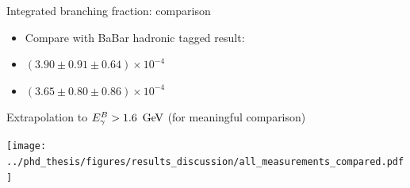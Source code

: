 \documentclass[xcolor=dvipsnames]{beamer}
\begin{document}
\begin{frame}{Integrated branching fraction: comparison}
\centering\scriptsize

\begin{itemize}
   \item Compare with BaBar hadronic tagged result:
   \item[] $(3.90 \pm 0.91 \pm 0.64)\times 10^{-4}$\\
   \item[] $(3.65 \pm 0.80 \pm 0.86)\times 10^{-4}$\\

\end{itemize}

Extrapolation to ${E^B_{\gamma}}>1.6~\mathrm{\,Ge\kern -0.1em V}$ (for meaningful comparison)

      \texttt{[image: ../phd\_thesis/figures/results\_discussion/all\_measurements\_compared.pdf]}


      
\end{frame}
\end{document}
